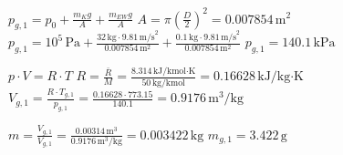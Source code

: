 \( p_{g,1} = p_0 + \frac{m_K g}{A} + \frac{m_{EW} g}{A} \)  
\( A = \pi \left(\frac{D}{2}\right)^2 = 0.007854 \, \text{m}^2 \)  
\( p_{g,1} = 10^5 \, \text{Pa} + \frac{32 \, \text{kg} \cdot 9.81 \, \text{m/s}^2}{0.007854 \, \text{m}^2} + \frac{0.1 \, \text{kg} \cdot 9.81 \, \text{m/s}^2}{0.007854 \, \text{m}^2} \)  
\( p_{g,1} = 140.1 \, \text{kPa} \)  

\( p \cdot V = R \cdot T \)  
\( R = \frac{\bar{R}}{M} = \frac{8.314 \, \text{kJ/kmol·K}}{50 \, \text{kg/kmol}} = 0.16628 \, \text{kJ/kg·K} \)  
\( V_{g,1} = \frac{R \cdot T_{g,1}}{p_{g,1}} = \frac{0.16628 \cdot 773.15}{140.1} = 0.9176 \, \text{m}^3/\text{kg} \)  

\( m = \frac{V_{g,1}}{V_{g,1}} = \frac{0.00314 \, \text{m}^3}{0.9176 \, \text{m}^3/\text{kg}} = 0.003422 \, \text{kg} \)  
\( m_{g,1} = 3.422 \, \text{g} \)